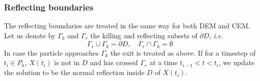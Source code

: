 \subsubsection{Reflecting boundaries}
The reflecting boundaries are treated in the same way for both DEM and CEM. Let us denote by $\Gamma_k$ and $\Gamma_r$ the killing and reflecting subsets of $\partial D$, \textit{i.e.}
\begin{equation}\label{eq:Boundaries}
	\Gamma_r \cup \Gamma_k = \partial D, \quad \Gamma_r \cap \Gamma_k = \emptyset
\end{equation} 
In case the particle approaches $\Gamma_k$ the exit is treated as above. If for a timestep of $t_i \in P_h$, $X(t_i)$ is not in $D$ and has crossed $\Gamma_r$ at a time $t_{i-1} < t < t_i$, we update the solution to be the normal reflection inside $D$ of $X(t_i)$.




